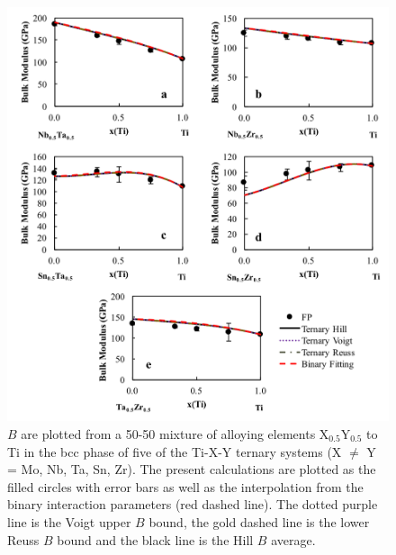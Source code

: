 \pagebreak
\begin{figure}[H]
	\centering
	\includegraphics[width=\textwidth]{Chapter-6/Figures/tixybulk2.png}
	\caption{$B$ are plotted from a 50-50 mixture of alloying elements X$_{0.5}$Y$_{0.5}$ to Ti in the bcc phase of five of the Ti-X-Y ternary systems (X $\neq$ Y = Mo, Nb, Ta, Sn, Zr). The present calculations are plotted as the filled circles with error bars as well as the interpolation from the binary interaction parameters (red dashed line). The dotted purple line is the Voigt upper $B$ bound, the gold dashed line is the lower Reuss $B$ bound and the black line is the Hill $B$ average.}
	\label{Ch6-figure:tixybulk2}
\end{figure}

